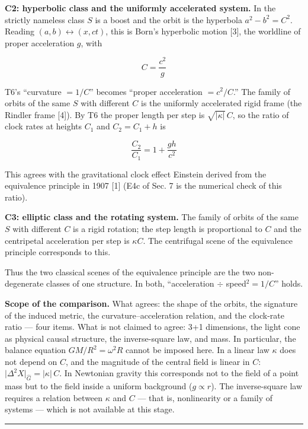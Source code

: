 \documentclass[
  a4paper,
]{article}
\begin{document}
\textbf{C2: hyperbolic class and the uniformly accelerated system.} In
the strictly nameless class \(S\) is a boost and the orbit is the
hyperbola \(a^2-b^2=C^2\). Reading \((a,b)\leftrightarrow(x,ct)\), this
is Born's hyperbolic motion {[}3{]}, the worldline of proper
acceleration \(g\), with

\[
\boxed{\;C=\frac{c^2}{g}\;}
\]

T6's ``curvature \(=1/C\)'' becomes ``proper acceleration \(=c^2/C\).''
The family of orbits of the same \(S\) with different \(C\) is the
uniformly accelerated rigid frame (the Rindler frame {[}4{]}). By T6 the
proper length per step is \(\sqrt{\lvert\kappa\rvert}\,C\), so the ratio
of clock rates at heights \(C_1\) and \(C_2=C_1+h\) is

\[
\frac{C_2}{C_1}=1+\frac{gh}{c^2}
\]

This agrees with the gravitational clock effect Einstein derived from
the equivalence principle in 1907 {[}1{]} (E4c of Sec. 7 is the
numerical check of this ratio).

\textbf{C3: elliptic class and the rotating system.} The family of
orbits of the same \(S\) with different \(C\) is a rigid rotation; the
step length is proportional to \(C\) and the centripetal acceleration
per step is \(\kappa C\). The centrifugal scene of the equivalence
principle corresponds to this.

Thus the two classical scenes of the equivalence principle are the two
non-degenerate classes of one structure. In both, ``acceleration
\(\div\) speed\(^2=1/C\)'' holds.

\textbf{Scope of the comparison.} What agrees: the shape of the orbits,
the signature of the induced metric, the curvature--acceleration
relation, and the clock-rate ratio --- four items. What is not claimed
to agree: 3+1 dimensions, the light cone as physical causal structure,
the inverse-square law, and mass. In particular, the balance equation
\(GM/R^2=\omega^2R\) cannot be imposed here. In a linear law \(\kappa\)
does not depend on \(C\), and the magnitude of the central field is
linear in \(C\):
\(\lvert\Delta^2X\rvert_{\hat G}=\lvert\kappa\rvert\,C\). In Newtonian
gravity this corresponds not to the field of a point mass but to the
field inside a uniform background (\(g\propto r\)). The inverse-square
law requires a relation between \(\kappa\) and \(C\) --- that is,
nonlinearity or a family of systems --- which is not available at this
stage.

\begin{center}\rule{0.5\linewidth}{0.5pt}\end{center}
\end{document}

